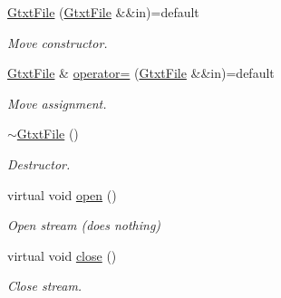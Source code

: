 \begin{DoxyCompactItemize}
\mbox{\label{classsamp_files_1_1_gtxt_file_a1514f20af2494f9ca9f232f7b3ae6cec}} 
\hyperlink{classsamp_files_1_1_gtxt_file_a1514f20af2494f9ca9f232f7b3ae6cec}{Gtxt\+File} (\hyperlink{classsamp_files_1_1_gtxt_file}{Gtxt\+File} \&\&in)=default
\begin{DoxyCompactList}\small\item\em Move constructor. \end{DoxyCompactList}\item 
\mbox{\label{classsamp_files_1_1_gtxt_file_a29107fef9662b347b440a8284c3c967e}} 
\hyperlink{classsamp_files_1_1_gtxt_file}{Gtxt\+File} \& \hyperlink{classsamp_files_1_1_gtxt_file_a29107fef9662b347b440a8284c3c967e}{operator=} (\hyperlink{classsamp_files_1_1_gtxt_file}{Gtxt\+File} \&\&in)=default
\begin{DoxyCompactList}\small\item\em Move assignment. \end{DoxyCompactList}\item 
\mbox{\label{classsamp_files_1_1_gtxt_file_aee4e94c994fc6776aa95444fcec4f6a3}} 
\hyperlink{classsamp_files_1_1_gtxt_file_aee4e94c994fc6776aa95444fcec4f6a3}{$\sim$\+Gtxt\+File} ()
\begin{DoxyCompactList}\small\item\em Destructor. \end{DoxyCompactList}\item 
\mbox{\label{classsamp_files_1_1_gtxt_file_ad93a05c665b81cca13c96910a7715755}} 
virtual void \hyperlink{classsamp_files_1_1_gtxt_file_ad93a05c665b81cca13c96910a7715755}{open} ()
\begin{DoxyCompactList}\small\item\em Open stream (does nothing) \end{DoxyCompactList}\item 
\mbox{\label{classsamp_files_1_1_gtxt_file_ab70cf8235e1e7f519f2d114ec99973a7}} 
virtual void \hyperlink{classsamp_files_1_1_gtxt_file_ab70cf8235e1e7f519f2d114ec99973a7}{close} ()
\begin{DoxyCompactList}\small\item\em Close stream. \end{DoxyCompactList}\end{DoxyCompactItemize}
